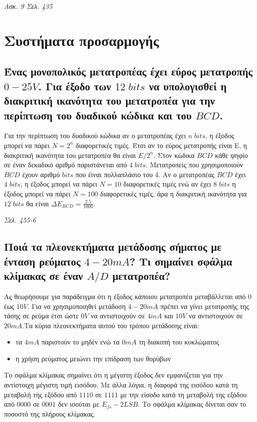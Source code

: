 \documentclass{article}
\begin{document}
\emph{Ασκ. 9 Σελ. 435}

\section{Συστήματα προσαρμογής}
\subsection{Ένας μονοπολικός μετατροπέας έχει εύρος μετατροπής $0-25V$. Για έξοδο των $12\; bits$ να υπολογισθεί η διακριτική ικανότητα του μετατροπέα για την περίπτωση 
του δυαδικού κώδικα και του $BCD$.}
Για την περίπτωση του δυαδικού κώδικα αν ο μετατροπέας έχει $n\; bits$, η έξοδος μπορεί να πάρει $N=2^n$ διαφορετικές τιμές. Έτσι αν το εύρος μετατροπής είναι Ε, η διακριτική
ικανότητα του μετατροπέα θα είναι $E/2^n$. Στον κώδικα $BCD$ κάθε ψηφίο σε έναν δεκαδικό αριθμό παριστάνεται από $4\; bits$. Μετατροπείς που χρησιμοποιούν $BCD$ 
έχουν αριθμό $bits$ που έιναι πολλαπλάσιο του 4. Αν ο μετατροπέας $BCD$ έχει $4\; bits$, η έξοδος μπορεί να πάρει $N=10$ διαφορετικές τιμές ενώ αν έχει $8\; bits$ η
έξοδος μπορεί να πάρει $N=100$ διαφορετικές τιμές, άρα η διακριτική ικανότητα για $12\; bits$ θα είναι $\Delta E_{BCD}=\frac{2.5}{1000}$.

\emph{Σελ. 455-6}

\subsection{Ποιά τα πλεονεκτήματα μετάδοσης σήματος με ένταση ρεύματος $4-20mA$? Τι σημαίνει σφάλμα κλίμακας σε έναν $A/D$ μετατροπέα?}
Ας θεωρήσουμε για παράδειγμα ότι η έξοδος κάποιου μετατροπέα μεταβάλλεται από $0$ έως $10V$. Για να χρησιμοποιηθεί μετάδοση $4-20 mA$ πρέπει να γίνει μετατροπής της 
τάσης σε ρεύμα έτσι ώστε $0V$ να αντιστοιχούν σε $4 mA$ και $10V$ να αντιστοιχούν σε $20 mA$.Τα κύρια πλεονεκτήματα αυτού του τρόπου μετάδοσης είναι:

\begin{itemize}
    \item τα $4mA$ παριστούν το μηδέν ενώ τα $0mA$ τη διακοπή του κυκλώματος
    \item η χρήση ρεύματος μειώνει την επίδραση των θορύβων
\end{itemize}

Το σφάλμα κλίμακας σημαίνει ότι η μέγιστη έξοδος δεν εμφανίζεται για την αντίστοιχη μέγιστη τιμή εισόδου. Με άλλα λόγια, η διαφορά της εισόδου κατά τη μεταβολή της 
εξόδου από $1110$ σε $1111$ με την είσοδο κατά τη μεταβολή της εξόδου από $0000$ σε $0001$ δεν ισούται με $E_{fs}-2LSB$. Το σφάλμα κλίμακας δίνεται σαν το ποσοστό 
της πλήρους κλίμακας.
\end{document}
